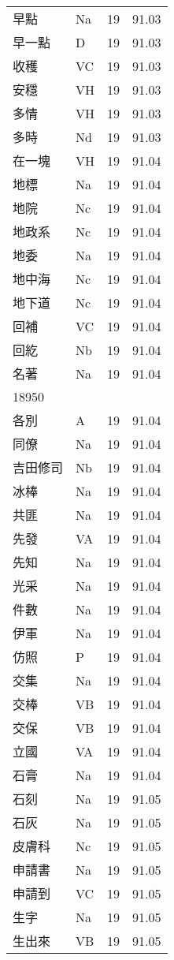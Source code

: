 \documentclass[twocolumn]{book}
\begin{document}
\begin{supertabular}{llrr}
早點 & Na & 19 &  91.03\\
早一點 & D & 19 &  91.03\\
收穫 & VC & 19 &  91.03\\
安穩 & VH & 19 &  91.03\\
多情 & VH & 19 &  91.03\\
多時 & Nd & 19 &  91.03\\
在一塊 & VH & 19 &  91.04\\
地標 & Na & 19 &  91.04\\
地院 & Nc & 19 &  91.04\\
地政系 & Nc & 19 &  91.04\\
地委 & Na & 19 &  91.04\\
地中海 & Nc & 19 &  91.04\\
地下道 & Nc & 19 &  91.04\\
回補 & VC & 19 &  91.04\\
回紇 & Nb & 19 &  91.04\\
名著 & Na & 19 &  91.04\\
18950\\
各別 & A & 19 &  91.04\\
同僚 & Na & 19 &  91.04\\
吉田修司 & Nb & 19 &  91.04\\
冰棒 & Na & 19 &  91.04\\
共匪 & Na & 19 &  91.04\\
先發 & VA & 19 &  91.04\\
先知 & Na & 19 &  91.04\\
光采 & Na & 19 &  91.04\\
件數 & Na & 19 &  91.04\\
伊軍 & Na & 19 &  91.04\\
仿照 & P & 19 &  91.04\\
交集 & Na & 19 &  91.04\\
交棒 & VB & 19 &  91.04\\
交保 & VB & 19 &  91.04\\
立國 & VA & 19 &  91.04\\
石膏 & Na & 19 &  91.04\\
石刻 & Na & 19 &  91.05\\
石灰 & Na & 19 &  91.05\\
皮膚科 & Nc & 19 &  91.05\\
申請書 & Na & 19 &  91.05\\
申請到 & VC & 19 &  91.05\\
生字 & Na & 19 &  91.05\\
生出來 & VB & 19 &  91.05\\

\end{supertabular}
\end{document}
